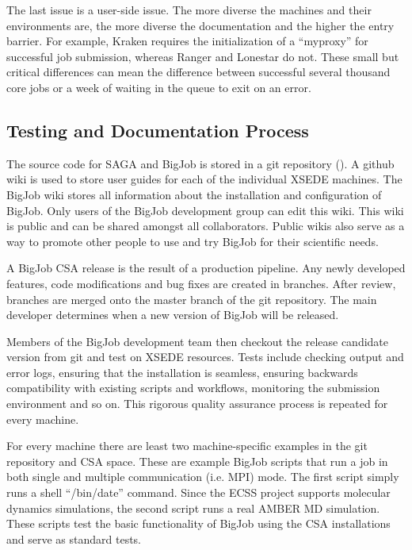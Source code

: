 \documentclass{sig-alternate}
\begin{document}
The last issue is a user-side issue. The more diverse the machines and their
environments are, the more diverse the documentation and the higher the entry
barrier. For example, Kraken requires the initialization of a ``myproxy'' for
successful job submission, whereas Ranger and Lonestar do not. These small  but
critical differences can mean the difference between successful several thousand
core jobs or a week of waiting in the queue to exit on an error.


\subsection{Testing and Documentation Process}

The source code for SAGA and BigJob is stored in a
git repository (\cite{bigjob_web}). A github wiki is used to store user guides
for each of the individual XSEDE machines. The BigJob wiki stores all
information about the installation and configuration of BigJob. Only users of
the BigJob development group can edit this wiki. This wiki is public and can be
shared amongst all collaborators. Public wikis also serve as a way to promote
other people to use and try BigJob for their scientific needs.

A BigJob CSA release is the result of a production pipeline. Any newly developed
features, code modifications and bug fixes are created in branches. After
review, branches are merged onto the master branch of the git repository. The
main developer determines when a new version of BigJob will be released. 

Members of the BigJob development team then checkout the release candidate
version from git and test on XSEDE resources. Tests include checking output and error logs, 
ensuring that the installation is seamless, ensuring backwards compatibility with existing 
scripts and workflows, monitoring the submission environment and so on. This rigorous quality 
assurance process is repeated for every machine.

For every machine there are least two machine-specific examples in the git
repository and CSA space. These are example BigJob scripts that run a job in
both single and multiple communication (i.e. MPI) mode. The first script simply
runs a shell ``/bin/date'' command. Since the ECSS project supports molecular
dynamics simulations, the second script runs a real AMBER MD simulation. These
scripts test the basic functionality of BigJob using the CSA installations and
serve as standard tests.
\end{document}
